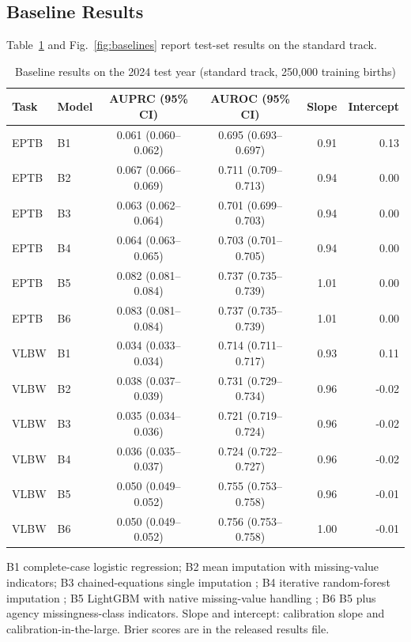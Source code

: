 \documentclass[journal]{IEEEtran}
\begin{document}
\subsection{Baseline Results}

Table~\ref{tab:baselines} and Fig.~\ref{fig:baselines} report test-set results on the standard track.

\begin{table}[!t]
\centering
\footnotesize
\caption{Baseline results on the 2024 test year (standard track, 250,000 training births)}
\label{tab:baselines}
\begin{tabular}{llccrr}
\toprule
\textbf{Task} & \textbf{Model} & \textbf{AUPRC (95\% CI)} & \textbf{AUROC (95\% CI)} & \textbf{Slope} & \textbf{Intercept} \\
\midrule
EPTB & B1 & 0.061 (0.060--0.062) & 0.695 (0.693--0.697) & 0.91 & 0.13 \\
EPTB & B2 & 0.067 (0.066--0.069) & 0.711 (0.709--0.713) & 0.94 & 0.00 \\
EPTB & B3 & 0.063 (0.062--0.064) & 0.701 (0.699--0.703) & 0.94 & 0.00 \\
EPTB & B4 & 0.064 (0.063--0.065) & 0.703 (0.701--0.705) & 0.94 & 0.00 \\
EPTB & B5 & 0.082 (0.081--0.084) & 0.737 (0.735--0.739) & 1.01 & 0.00 \\
EPTB & B6 & 0.083 (0.081--0.084) & 0.737 (0.735--0.739) & 1.01 & 0.00 \\
VLBW & B1 & 0.034 (0.033--0.034) & 0.714 (0.711--0.717) & 0.93 & 0.11 \\
VLBW & B2 & 0.038 (0.037--0.039) & 0.731 (0.729--0.734) & 0.96 & -0.02 \\
VLBW & B3 & 0.035 (0.034--0.036) & 0.721 (0.719--0.724) & 0.96 & -0.02 \\
VLBW & B4 & 0.036 (0.035--0.037) & 0.724 (0.722--0.727) & 0.96 & -0.02 \\
VLBW & B5 & 0.050 (0.049--0.052) & 0.755 (0.753--0.758) & 0.96 & -0.01 \\
VLBW & B6 & 0.050 (0.049--0.052) & 0.756 (0.753--0.758) & 1.00 & -0.01 \\
\bottomrule
\end{tabular}
\par\vspace{2pt}\parbox{\textwidth}{\scriptsize B1 complete-case logistic regression; B2 mean imputation with missing-value indicators; B3 chained-equations single imputation \cite{vanbuuren2011}; B4 iterative random-forest imputation \cite{stekhoven2012}; B5 LightGBM with native missing-value handling \cite{ke2017}; B6 B5 plus agency missingness-class indicators. Slope and intercept: calibration slope and calibration-in-the-large. Brier scores are in the released results file.}
\end{table}
\end{document}
